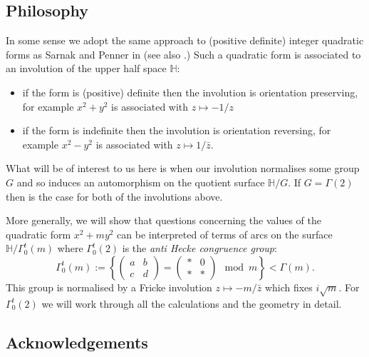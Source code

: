 \documentclass[12pt,a4paper]{amsart}
\def\ah{\Gamma_0^t(2)}
\begin{document}
\subsection{Philosophy}


In some sense we adopt the same approach to (positive definite)
integer quadratic forms as Sarnak \cite{sarnak} and
Penner in \cite{bob} (see also \cite{springborn1}.)
Such a
quadratic form is associated to an involution of the upper half
space $\mathbb{H}$: 
\begin{itemize}
	\item if the form is (positive) definite then the
		involution is orientation preserving,
		for example  $x^2 + y^2$ is associated with $z\mapsto -1 / z$
	\item if the form is indefinite then the involution is
		orientation reversing, for example $x^2 - y^2$ is
		associated with $z\mapsto 1 / \bar{z}.$
\end{itemize}
What will be of interest to us here is
when our involution normalises some group $G$
and so induces an automorphism on the quotient surface
$\mathbb{H}/G$. If $G=\Gamma(2)$ then  is the case for both of the
involutions above.

More generally, we will show that questions concerning the values of the quadratic form $x^2
+ m y^2$ can be interpreted of terms of arcs on the surface
$\mathbb{H}/\Gamma^t_0(m)$ where
$\ah$ is the 
\textit{anti Hecke congruence group}:
$$ \Gamma^t_0(m) := \left \{ \begin{pmatrix} a & b \\ c & d \end{pmatrix} = 
\begin{pmatrix} * & 0 \\ * & * \end{pmatrix} \mod m \right \} <
\Gamma(m).$$
This group is 
normalised by a Fricke involution $z\mapsto -m / \bar{z}$
which fixes $i\sqrt{m}$.
For $\Gamma^t_0(2)$  we will work through all the calculations and
the geometry in detail.


\subsection{Acknowledgements}
\end{document}
